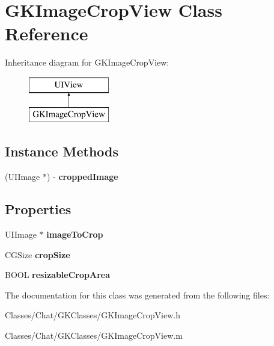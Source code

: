 \hypertarget{interface_g_k_image_crop_view}{}\section{G\+K\+Image\+Crop\+View Class Reference}
\label{interface_g_k_image_crop_view}
Inheritance diagram for G\+K\+Image\+Crop\+View\+:\begin{figure}[H]
\begin{center}
\leavevmode
\includegraphics[height=2.000000cm]{interface_g_k_image_crop_view}
\end{center}
\end{figure}
\subsection*{Instance Methods}
\begin{DoxyCompactItemize}
\item 
\hypertarget{interface_g_k_image_crop_view_a87ea6d54f5536509525eccf4d18c7227}{}(U\+I\+Image $\ast$) -\/ {\bfseries cropped\+Image}\label{interface_g_k_image_crop_view_a87ea6d54f5536509525eccf4d18c7227}

\end{DoxyCompactItemize}
\subsection*{Properties}
\begin{DoxyCompactItemize}
\item 
\hypertarget{interface_g_k_image_crop_view_a33744a9eca7f2d80e1f07b24577723ce}{}U\+I\+Image $\ast$ {\bfseries image\+To\+Crop}\label{interface_g_k_image_crop_view_a33744a9eca7f2d80e1f07b24577723ce}

\item 
\hypertarget{interface_g_k_image_crop_view_a6f8bc29704cf71a9556c7f7f374aab94}{}C\+G\+Size {\bfseries crop\+Size}\label{interface_g_k_image_crop_view_a6f8bc29704cf71a9556c7f7f374aab94}

\item 
\hypertarget{interface_g_k_image_crop_view_ad0f423ca2ed7da0525316e5899861e87}{}B\+O\+O\+L {\bfseries resizable\+Crop\+Area}\label{interface_g_k_image_crop_view_ad0f423ca2ed7da0525316e5899861e87}

\end{DoxyCompactItemize}


The documentation for this class was generated from the following files\+:\begin{DoxyCompactItemize}
\item 
Classes/\+Chat/\+G\+K\+Classes/G\+K\+Image\+Crop\+View.\+h\item 
Classes/\+Chat/\+G\+K\+Classes/G\+K\+Image\+Crop\+View.\+m\end{DoxyCompactItemize}
